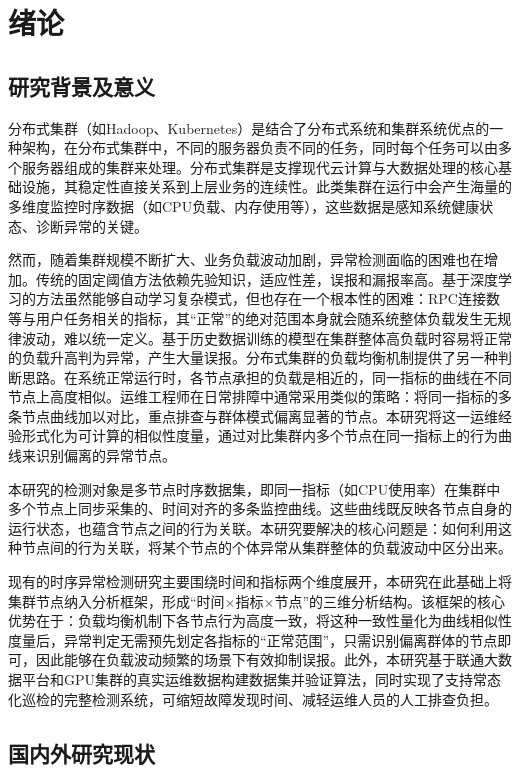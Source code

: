 \chapter{绪论}\label{chap:introduction}

\section{研究背景及意义}

分布式集群（如Hadoop、Kubernetes）是结合了分布式系统和集群系统优点的一种架构，在分布式集群中，不同的服务器负责不同的任务，同时每个任务可以由多个服务器组成的集群来处理。分布式集群是支撑现代云计算与大数据处理的核心基础设施，其稳定性直接关系到上层业务的连续性。此类集群在运行中会产生海量的多维度监控时序数据（如CPU负载、内存使用等），这些数据是感知系统健康状态、诊断异常的关键。

然而，随着集群规模不断扩大、业务负载波动加剧，异常检测面临的困难也在增加。传统的固定阈值方法依赖先验知识，适应性差，误报和漏报率高。基于深度学习的方法虽然能够自动学习复杂模式，但也存在一个根本性的困难：RPC连接数等与用户任务相关的指标，其``正常''的绝对范围本身就会随系统整体负载发生无规律波动，难以统一定义。基于历史数据训练的模型在集群整体高负载时容易将正常的负载升高判为异常，产生大量误报。分布式集群的负载均衡机制提供了另一种判断思路。在系统正常运行时，各节点承担的负载是相近的，同一指标的曲线在不同节点上高度相似。运维工程师在日常排障中通常采用类似的策略：将同一指标的多条节点曲线加以对比，重点排查与群体模式偏离显著的节点。本研究将这一运维经验形式化为可计算的相似性度量，通过对比集群内多个节点在同一指标上的行为曲线来识别偏离的异常节点。

本研究的检测对象是多节点时序数据集，即同一指标（如CPU使用率）在集群中多个节点上同步采集的、时间对齐的多条监控曲线。这些曲线既反映各节点自身的运行状态，也蕴含节点之间的行为关联。本研究要解决的核心问题是：如何利用这种节点间的行为关联，将某个节点的个体异常从集群整体的负载波动中区分出来。

现有的时序异常检测研究主要围绕时间和指标两个维度展开，本研究在此基础上将集群节点纳入分析框架，形成``时间$\times$指标$\times$节点''的三维分析结构。该框架的核心优势在于：负载均衡机制下各节点行为高度一致，将这种一致性量化为曲线相似性度量后，异常判定无需预先划定各指标的``正常范围''，只需识别偏离群体的节点即可，因此能够在负载波动频繁的场景下有效抑制误报。此外，本研究基于联通大数据平台和GPU集群的真实运维数据构建数据集并验证算法，同时实现了支持常态化巡检的完整检测系统，可缩短故障发现时间、减轻运维人员的人工排查负担。

\section{国内外研究现状}

